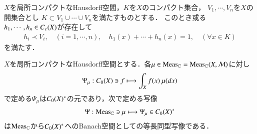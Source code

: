 	\begin{screen}
		\begin{lem}[コンパクト集合上の一の分割]
			$X$を局所コンパクトなHausdorff空間，$K$を$X$のコンパクト集合，
			$V_1,\cdots, V_n$を$X$の開集合とし
			$K \subset V_1 \cup \cdots \cup V_n$を満たすものとする．
			このとき或る$h_1,\cdots,h_n \in C_c (X)$が存在して
			\begin{align}
				h_i \prec V_i,  \quad (i=1,\cdots,n),
				\quad h_1(x) + \cdots + h_n(x) = 1, \quad (\forall x \in K)
			\end{align}
			を満たす．
		\end{lem}
	\end{screen}
	
	\begin{prf}
		
	\end{prf}
		
	\begin{screen}
		\begin{thm}[Rieszの表現定理]
			$X$を局所コンパクトなHausdorff空間とする．各$\mu \in \mathrm{Meas}_{\mathbb{C}} = \mathrm{Meas}_{\mathbb{C}}(X,\mathcal{M})$に対し
			\begin{align}
				\Psi_\mu: \cvan{X} \ni f \longmapsto \int_X f(x)\ \mu(dx)
				\label{eq:thm_complex_measure_riesz_representation_theorem_1}
			\end{align}
			で定める$\Psi_\mu$は$C_0 (X)^*$の元であり，次で定める写像
			\begin{align}
				\Psi: \mathrm{Meas}_{\mathbb{C}} \ni \mu \longmapsto \Psi_\mu \in C_0 (X)^*
			\end{align}
			は$\mathrm{Meas}_{\mathbb{C}}$から$C_0 (X)^*$へのBanach空間としての等長同型写像である．
			\label{thm:complex_measure_riesz_representation_theorem}
		\end{thm}
	\end{screen}
	
